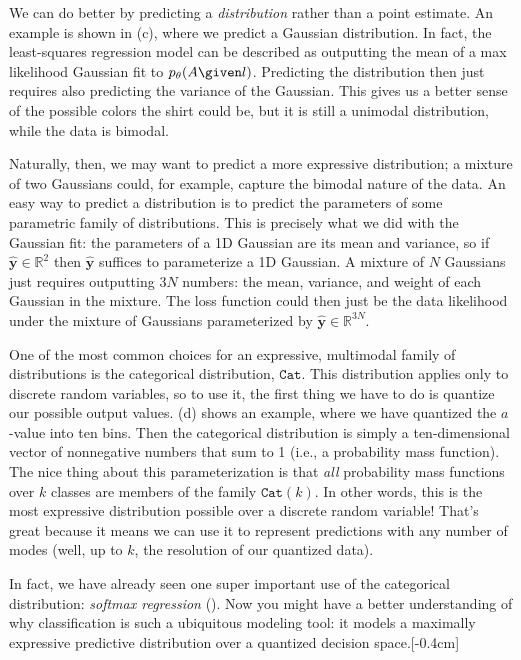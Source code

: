 We can do better by predicting a \textit{distribution} rather than a point estimate. An example is shown in \fig{\ref{fig:conditional_generative_models:tshirts}}(c), where we predict a Gaussian distribution. In fact, the least-squares regression model can be described as outputting the mean of a max likelihood Gaussian fit to $p_{\theta}(A \given l)$. Predicting the distribution then just requires also predicting the variance of the Gaussian. This gives us a better sense of the possible colors the shirt could be, but it is still a unimodal distribution, while the data is bimodal.

Naturally, then, we may want to predict a more expressive distribution; a mixture of two Gaussians could, for example, capture the bimodal nature of the data. An easy way to predict a distribution is to predict the parameters of some parametric family of distributions. This is precisely what we did with the Gaussian fit: the parameters of a 1D Gaussian are its mean and variance, so if $\hat{\mathbf{y}} \in \mathbb{R}^2$ then $\hat{\mathbf{y}}$ suffices to parameterize a 1D Gaussian. A mixture of $N$ Gaussians just requires outputting $3N$ numbers: the mean, variance, and weight of each Gaussian in the mixture. The loss function could then just be the data likelihood under the mixture of Gaussians parameterized by $\hat{\mathbf{y}} \in \mathbb{R}^{3N}$.

One of the most common choices for an expressive, multimodal family of distributions is the categorical distribution, $\texttt{Cat}$. This distribution applies only to discrete random variables, so to use it, the first thing we have to do is quantize our possible output values. \Fig{\ref{fig:conditional_generative_models:tshirts}}(d) shows an example, where we have quantized the $a$-value into ten bins. Then the categorical distribution is simply a ten-dimensional vector of nonnegative numbers that sum to 1 (i.e., a probability mass function). The nice thing about this parameterization is that \textit{all} probability mass functions over $k$ classes are members of the family $\texttt{Cat}(k)$. In other words, this is the most expressive distribution possible over a discrete random variable! That's great because it means we can use it to represent predictions with any number of modes (well, up to $k$, the resolution of our quantized data).

In fact, we have already seen one super important use of the categorical distribution: \textit{softmax regression} (\sect{\ref{sec:intro_to_learning:image_classification}}). Now you might have a better understanding of why classification is such a ubiquitous modeling tool: it models a maximally expressive predictive distribution over a quantized decision space.[-0.4cm]

